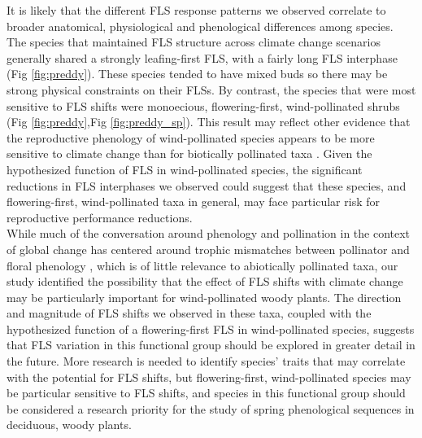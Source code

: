 \documentclass[11pt]{article}\usepackage[]{graphicx}\usepackage[]{color}
\begin{document}
\noindent It is likely that the different FLS response patterns we observed correlate to broader anatomical, physiological and phenological differences among species. The species that maintained FLS structure across climate change scenarios generally shared a strongly leafing-first FLS, with a fairly long FLS interphase (Fig \ref{fig:preddy}). These species tended to have mixed buds so there may be strong physical constraints on their FLSs. By contrast, the species that were most sensitive to FLS shifts were monoecious, flowering-first, wind-pollinated shrubs (Fig \ref{fig:preddy},Fig \ref{fig:preddy_sp}). This result may reflect other evidence that the reproductive phenology of wind-pollinated species appears to be more sensitive to climate change than for biotically pollinated taxa \citep{Ziello:2012aa}. Given the hypothesized function of FLS in wind-pollinated species, the significant reductions in FLS interphases we observed could suggest that these species, and flowering-first, wind-pollinated taxa in general, may face particular risk for reproductive performance reductions.\\

\noindent While much of the conversation around phenology and pollination in the context of global change has centered around trophic mismatches between pollinator and floral phenology \citep{Memmott2007}, which is of little relevance to abiotically pollinated taxa, our study identified the possibility that the effect of FLS shifts with climate change may be particularly important for wind-pollinated woody plants. The direction and magnitude of FLS shifts we observed in these taxa, coupled with the hypothesized function of a flowering-first FLS in wind-pollinated species, suggests that FLS variation in this functional group should be explored in greater detail in the future. More research is needed to identify species' traits that may correlate with the potential for FLS shifts, but flowering-first, wind-pollinated species may be particular sensitive to FLS shifts, and species in this functional group should be considered a research priority for the study of spring phenological sequences in deciduous, woody plants.\\ 


 
\end{document}
